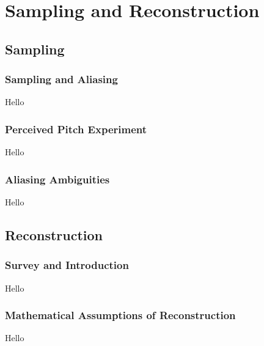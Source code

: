 \chapter{Sampling and Reconstruction}

\section{Sampling}
\subsection{Sampling and Aliasing}
Hello

\subsection{Perceived Pitch Experiment}
Hello

\subsection{Aliasing Ambiguities}
Hello

\section{Reconstruction}
\subsection{Survey and Introduction}
Hello

\subsection{Mathematical Assumptions of Reconstruction}
Hello
